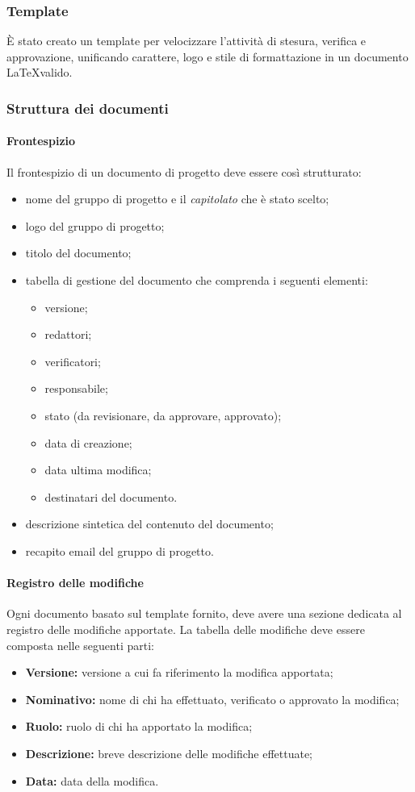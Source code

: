   \subsubsection{Template}
  \`E stato creato un template per velocizzare l'attività di stesura, verifica e
  approvazione, unificando carattere, logo e stile di formattazione
  in un documento \LaTeX \space valido.

  \subsubsection{Struttura dei documenti}
  \paragraph{Frontespizio}
  Il frontespizio di un documento di progetto deve essere così strutturato:
  \begin{itemize}
    \item nome del gruppo di progetto e il \textit{capitolato\glo} che è stato scelto;
    \item logo del gruppo di progetto;
    \item titolo del documento;
    \item tabella di gestione del documento che comprenda i seguenti elementi:
    \begin{itemize}
      \item versione;
      \item redattori;
      \item verificatori;
      \item responsabile;
      \item stato (da revisionare, da approvare, approvato);
      \item data di creazione;
      \item data ultima modifica;
      \item destinatari del documento.
    \end{itemize}
    \item descrizione sintetica del contenuto del documento;
    \item recapito email del gruppo di progetto.
  \end{itemize}
  \paragraph{Registro delle modifiche}
  Ogni documento basato sul template fornito, deve avere una sezione dedicata al registro delle modifiche apportate.
  La tabella delle modifiche deve essere composta nelle seguenti parti:
  \begin{itemize}
    \item \textbf{Versione:} versione a cui fa riferimento la modifica apportata;
    \item \textbf{Nominativo:} nome di chi ha effettuato, verificato o approvato la modifica;
    \item \textbf{Ruolo:} ruolo di chi ha apportato la modifica;
    \item \textbf{Descrizione:} breve descrizione delle modifiche effettuate;
    \item \textbf{Data:} data della modifica.
  \end{itemize}
